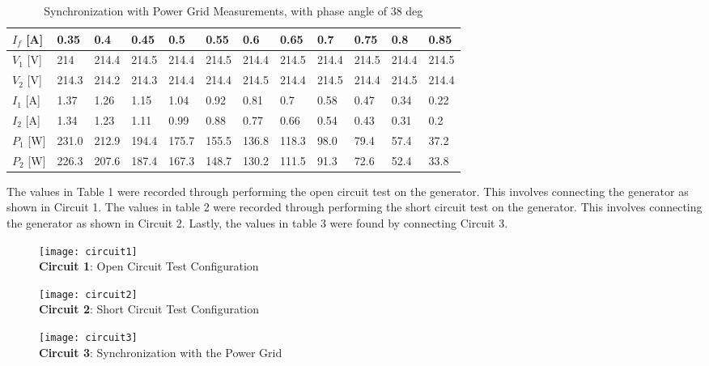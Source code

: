 \documentclass[]{report}
\begin{document}
\begin{table}[h] \centering
	\begin{tabular}{l|lllllllllll}
		$I_f$ [A] & 0.35  & 0.4   & 0.45  & 0.5   & 0.55  & 0.6   & 0.65  & 0.7   & 0.75  & 0.8   & 0.85  \\ \hline
		$V_1$ [V] & 214   & 214.4 & 214.5 & 214.4 & 214.5 & 214.4 & 214.5 & 214.4 & 214.5 & 214.4 & 214.5 \\ \hline
		$V_2$ [V] & 214.3 & 214.2 & 214.3 & 214.4 & 214.4 & 214.5 & 214.4 & 214.5 & 214.4 & 214.5 & 214.4 \\ \hline
		$I_1$ [A] & 1.37  & 1.26  & 1.15  & 1.04  & 0.92  & 0.81  & 0.7   & 0.58  & 0.47  & 0.34  & 0.22  \\ \hline
		$I_2$ [A] & 1.34  & 1.23  & 1.11  & 0.99  & 0.88  & 0.77  & 0.66  & 0.54  & 0.43  & 0.31  & 0.2   \\ \hline
		$P_1$ [W] & 231.0 & 212.9 & 194.4 & 175.7 & 155.5 & 136.8 & 118.3 & 98.0  & 79.4  & 57.4  & 37.2  \\ \hline
		$P_2$ [W] & 226.3 & 207.6 & 187.4 & 167.3 & 148.7 & 130.2 & 111.5 & 91.3  & 72.6  & 52.4  & 33.8 
	\end{tabular}
	\caption{Synchronization with Power Grid Measurements, with phase angle of 38 deg}
\end{table}
\newpage
The values in Table 1 were recorded through performing the open circuit test on the generator. This involves connecting the generator as shown in Circuit 1. The values in table 2 were recorded through performing the short circuit test on the generator. This involves connecting the generator as shown in Circuit 2. Lastly, the values in table 3 were found by connecting Circuit 3.

\begin{figure}[H]
	\centering
	\texttt{[image: circuit1]} \\
	\textbf{Circuit 1}: Open Circuit Test Configuration
\end{figure}

\begin{figure}[H]
	\centering
	\texttt{[image: circuit2]} \\
	\textbf{Circuit 2}: Short Circuit Test Configuration
\end{figure}

\begin{figure}[H]
	\centering
	\texttt{[image: circuit3]} \\
	\textbf{Circuit 3}: Synchronization with the Power Grid
\end{figure}
\end{document}
